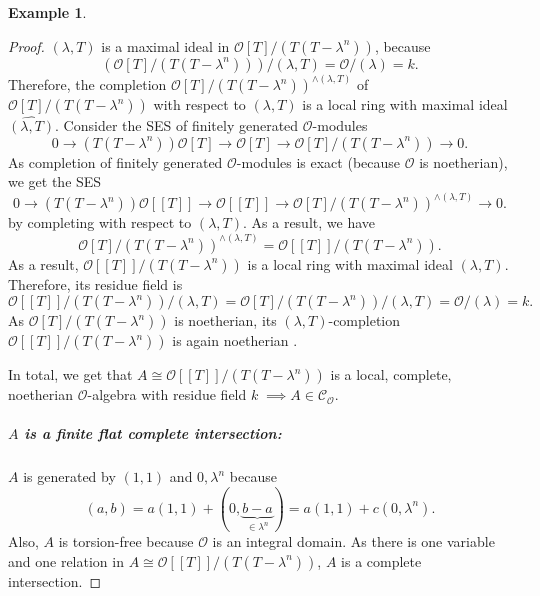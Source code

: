 \documentclass{article}
\theoremstyle{plain}%
\theoremstyle{definition}
\newtheorem{example}{Example}[section]
\theoremstyle{remark}
\newcommand{\co}{\mathcal{C}_\mathcal{O}}
\begin{document}
\begin{example}
\begin{proof}
        \((\lambda, T)\) is a maximal ideal in \(\mathcal{O}[T]/(T(T-\lambda^n))\), because
        \[\left(\mathcal{O}[T]/(T(T-\lambda^n))\right)/(\lambda, T) = \mathcal{O}/(\lambda) = k.\]
        Therefore, the completion \(\mathcal{O}[T]/(T(T-\lambda^n))^{\wedge(\lambda, T)}\) 
        of \(\mathcal{O}[T]/(T(T-\lambda^n))\) with respect to \((\lambda, T)\) is a local ring with maximal ideal
        \(\widehat{(\lambda, T)}\).
        Consider the SES of finitely generated \(\mathcal{O}\)-modules
        \[
            0 \to (T(T - \lambda^n)) \mathcal{O}[T] \to \mathcal{O}[T] \to \mathcal{O}[T]/(T(T-\lambda^n)) \to 0.
        \]
        As completion of finitely generated \(\mathcal{O}\)-modules is exact (because \(\mathcal{O}\) is noetherian), we get the SES
        \[
            0 \to (T(T-\lambda^n))\mathcal{O}[[T]] \to \mathcal{O}[[T]] \to \mathcal{O}[T]/(T(T-\lambda^n))^{\wedge (\lambda, T)}  \to 0.
        \]
        by completing with respect to \((\lambda, T)\).
        As a result, we have
        \[
            \mathcal{O}[T]/(T(T-\lambda^n))^{\wedge (\lambda, T)} = \mathcal{O}[[T]]/(T(T-\lambda^n)).
        \]
        As a result, \(\mathcal{O}[[T]]/(T(T-\lambda^n))\) is a local ring with maximal ideal \((\lambda, T)\).
        Therefore, its residue field is
        \[
            \mathcal{O}[[T]]/(T(T-\lambda^n))/(\lambda, T) = \mathcal{O}[T]/(T(T-\lambda^n))/(\lambda, T) = \mathcal{O}/(\lambda) = k.
        \]
        As \(\mathcal{O}[T]/(T(T-\lambda^n))\) is noetherian, its \((\lambda, T)\)-completion \(\mathcal{O}[[T]]/(T(T-\lambda^n))\)
        is again noetherian \cite[cf.][theorem 10.26]{Atiyah1969}.

        In total, we get that \(A \cong \mathcal{O}[[T]]/(T(T-\lambda^n))\) is a local, complete, noetherian \(\mathcal{O}\)-algebra 
        with residue field \(k\; \implies A \in \co\). 
        \subparagraph{\(A\) is a finite flat complete intersection:}
        \(A\) is generated by \((1,1)\) and \(0, \lambda^n\) because
        \[
            (a,b) = a(1,1) + (0, \underbrace{b-a}_{\in \lambda^n}) = a(1,1) + c(0, \lambda^n).
        \]
        Also, \(A\) is torsion-free because \(\mathcal{O}\) is an integral domain. 
        As there is one variable and one relation in \(A \cong \mathcal{O}[[T]]/(T(T-\lambda^n))\), \(A\) is a complete intersection.
    \end{proof}
\end{example}
\end{document}
